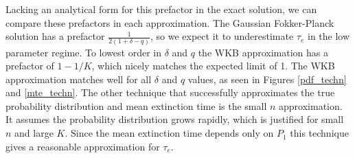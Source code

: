 \documentclass[a4paper,10pt]{article}
\numberwithin{equation}{section} %
\begin{document}
Lacking an analytical form for this prefactor in the exact solution, we can compare these prefactors in each approximation. 
The Gaussian Fokker-Planck solution has a prefactor $\frac{1}{2(1+\delta-q)}$, so we expect it to underestimate $\tau_e$ in the low parameter regime. %
To lowest order in $\delta$ and $q$ the WKB approximation has a prefactor of $1-1/K$, which nicely matches the expected limit of 1. 
The WKB approximation matches well for all $\delta$ and $q$ values, as seen in Figures \ref{pdf_techn} and \ref{mte_techn}. 
The other technique that successfully approximates the true probability distribution and mean extinction time is the small $n$ approximation. %
It assumes the probability distribution grows rapidly, which is justified for small $n$ and large $K$. 
Since the mean extinction time depends only on $P_1$ this technique gives a reasonable approximation for $\tau_e$. 

\end{document}

